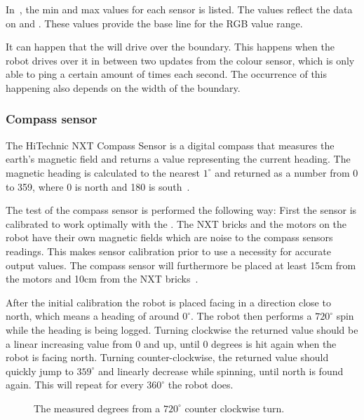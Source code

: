 In~, the min and max values for each sensor is listed. The values reflect the data on  and . These values provide the base line for the RGB value range.

It can happen that the \projname{} will drive over the boundary. This happens when the robot drives over it in between two updates from the colour sensor, which is only able to ping a certain amount of times each second. The occurrence of this happening also depends on the width of the boundary.

\subsubsection{Compass sensor}
The HiTechnic NXT Compass Sensor is a digital compass that measures the earth's magnetic field and returns a value representing the current heading. The magnetic heading is calculated to the nearest $1^\circ$ and returned as a number from 0 to 359, where 0 is north and 180 is south~\citep{compass}.

The test of the compass sensor is performed the following way: First the sensor is calibrated to work optimally with the \projname{}. The NXT bricks and the motors on the robot have their own magnetic fields which are noise to the compass sensors readings. This makes sensor calibration prior to use a necessity for accurate output values. The compass sensor will furthermore be placed at least 15cm from the motors and 10cm from the NXT bricks~\citep{compass}.

After the initial calibration the robot is placed facing in a direction close to north, which means a heading of around $0^\circ$. The robot then performs a $720^\circ$ spin while the heading is being logged. Turning clockwise the returned value should be a linear increasing value from 0 and up, until 0 degrees is hit again when the robot is facing north. Turning counter-clockwise, the returned value should quickly jump to $359^\circ$ and linearly decrease while spinning, until north is found again. This will repeat for every $360^\circ$ the robot does.

\begin{figure}[H]
     \caption{\label{fig:compass_sensor_test_graph} The measured degrees from a $720^\circ$ counter clockwise turn.}
\end{figure}

